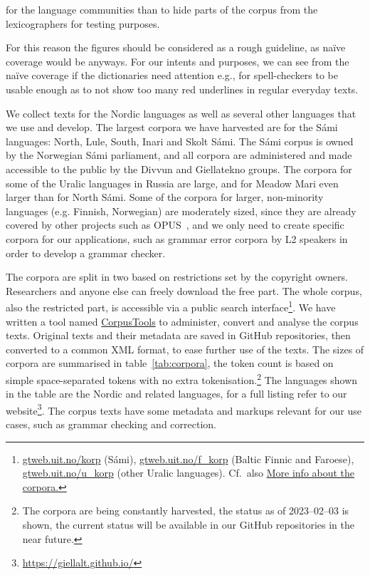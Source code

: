 \documentclass[free]{flammie}
\begin{document}
for the language communities than to hide parts of the corpus from the
lexicographers for testing purposes.

For this reason the figures should be considered as a rough guideline, as naïve
coverage would be anyways.  For our intents and purposes, we can see from the
naïve coverage if the dictionaries need attention e.g., for spell-checkers to be
usable enough as to not show too many red underlines in regular everyday texts.


We collect texts for the Nordic languages as well as several other languages
that we use and develop.  The largest corpora we have harvested are for the Sámi
languages: North, Lule, South, Inari and Skolt Sámi.  The Sámi corpus is owned
by the Norwegian Sámi parliament, and all corpora are administered and made
accessible to the public by the Divvun and Giellatekno groups.  The corpora for
some of the Uralic languages in Russia are large, and for Meadow Mari even
larger than for North Sámi.  Some of the corpora for larger, non-minority
languages (e.g. Finnish, Norwegian) are moderately sized, since they are already
covered by other projects such as OPUS~\cite{opus}, and we only need to create
specific corpora for our applications, such as grammar error corpora by L2
speakers in order to develop a grammar checker.

The corpora are split in two based on restrictions set by the copyright owners.
Researchers and anyone else can freely download the free part. The whole corpus,
also the restricted part, is accessible via a public search
interface\footnote{\href{https://gtweb.uit.no/korp}{gtweb.uit.no/korp} (Sámi),
\href{https://gtweb.uit.no/f_korp}{gtweb.uit.no/f\_korp} (Baltic Finnic and
Faroese), \href{https://gtweb.uit.no/u_korp}{gtweb.uit.no/u\_korp} (other Uralic
languages). Cf.\ also
\href{https://giellalt.github.io/ling/corpus_repositories.html}{More info about
the corpora.}}.  We have written a tool named
\href{https://github.com/giellalt/CorpusTools}{CorpusTools} to administer,
convert and analyse the corpus texts. Original texts and their metadata are
saved in GitHub repositories, then converted to a common XML format, to ease
further use of the texts.  The sizes of corpora are summarised in
table~\ref{tab:corpora}, the token count is based on simple space-separated
tokens with no extra tokenisation.\footnote{The corpora are being constantly
harvested, the status as of 2023--02--03 is shown, the current status will be
available in our GitHub repositories in the near future.} The languages shown in
the table are the Nordic and related languages, for a full listing refer to our
website\footnote{\url{https://giellalt.github.io/}}.  The corpus texts have some
metadata and markups relevant for our use cases, such as grammar checking and
correction.
\end{document}
